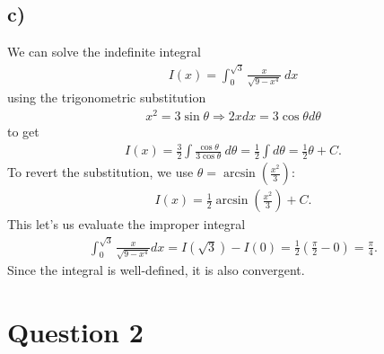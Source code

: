 \documentclass{article}
\begin{document}
\subsection*{c)}
We can solve the indefinite integral
\begin{align*}
  I(x)=\int_0^{\sqrt{3}}\frac{x}{\sqrt{9-x^4}}\:dx
\end{align*}
using the trigonometric substitution
\begin{align*}
  x^2 = 3\sin\theta \Rightarrow 2xdx = 3\cos \theta d\theta
\end{align*}
to get
\begin{align*}
  I(x)=\frac{3}{2}\int \frac{\cos\theta}{3\cos\theta}\:d\theta = \frac{1}{2}\int d\theta = \frac{1}{2}\theta + C.
\end{align*}
To revert the substitution, we use $\theta = \arcsin\left(\frac{x^2}{3}\right)$:
\begin{align*}
  I(x)=\frac{1}{2}\arcsin\left(\frac{x^2}{3}\right)+C.
\end{align*}
This let's us evaluate the improper integral
\begin{align*}
  \int_0^{\sqrt{3}}\frac{x}{\sqrt{9-x^4}}dx = I(\sqrt{3})-I(0)=\frac{1}{2}\left(\frac{\pi}{2}-0\right)=\frac{\pi}{4}.
\end{align*}
Since the integral is well-defined, it is also convergent.
\section*{Question 2}
\end{document}
